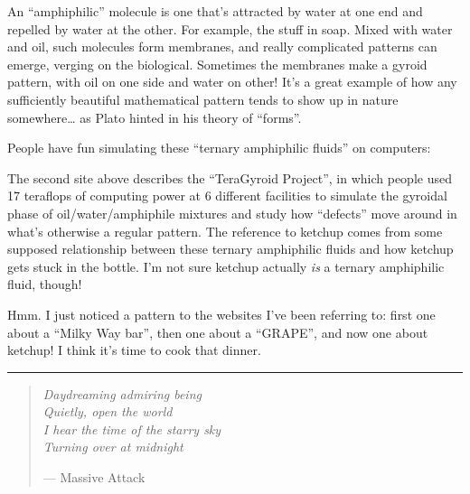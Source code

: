 \documentclass{article}
\renewcommand{\texttt}[1]{%
  \begingroup
  \ttfamily
  \begingroup\lccode`~=`/\lowercase{\endgroup\def~}{/\discretionary{}{}{}}%
  \begingroup\lccode`~=`[\lowercase{\endgroup\def~}{[\discretionary{}{}{}}%
  \begingroup\lccode`~=`.\lowercase{\endgroup\def~}{.\discretionary{}{}{}}%
  \catcode`/=\active\catcode`[=\active\catcode`.=\active
  \scantokens{#1\noexpand}%
  \endgroup
}
\begin{document}
An ``amphiphilic'' molecule is one that's attracted by water at one end
and repelled by water at the other. For example, the stuff in soap.
Mixed with water and oil, such molecules form membranes, and really
complicated patterns can emerge, verging on the biological. Sometimes
the membranes make a gyroid pattern, with oil on one side and water on
other! It's a great example of how any sufficiently beautiful
mathematical pattern tends to show up in nature somewhere\ldots{} as
Plato hinted in his theory of ``forms''.

People have fun simulating these ``ternary amphiphilic fluids'' on
computers:


The second site above describes the ``TeraGyroid Project'', in which
people used 17 teraflops of computing power at 6 different facilities to
simulate the gyroidal phase of oil/water/amphiphile mixtures and study
how ``defects'' move around in what's otherwise a regular pattern. The
reference to ketchup comes from some supposed relationship between these
ternary amphiphilic fluids and how ketchup gets stuck in the bottle. I'm
not sure ketchup actually \emph{is} a ternary amphiphilic fluid, though!

Hmm. I just noticed a pattern to the websites I've been referring to:
first one about a ``Milky Way bar'', then one about a ``GRAPE'', and now
one about ketchup! I think it's time to cook that dinner.

\begin{center}\rule{0.5\linewidth}{0.5pt}\end{center}

\begin{quote}
\emph{Daydreaming admiring being\\
Quietly, open the world\\
I hear the time of the starry sky\\
Turning over at midnight}

--- Massive Attack
\end{quote}
\end{document}
